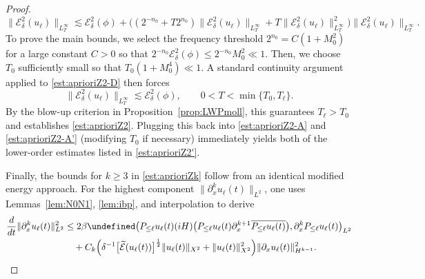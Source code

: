 \documentclass{amsart}
\numberwithin{equation}{section}
\let\Re=\undefined\DeclareMathOperator{\Re}{Re}
\begin{document}
\begin{proof}
\begin{equation}\label{est:aprioriZ2-D}
\| \mathcal{E}^2_\delta(u_\ell) \|_{L^\infty_T}\lesssim \mathcal{E}^2_\delta(\phi) +\Big( (2^{-n_0}+T2^{n_0}) \| \mathcal{E}^2_\delta(u_\ell) \|_{L^\infty_T} +T\| \mathcal{E}^2_\delta(u_\ell) \|_{L^\infty_T}^2\Big) \|\mathcal{E}^2_\delta(u_\ell) \|_{L^\infty_T} .
\end{equation}
To prove the main bounds, we select the frequency threshold $2^{n_0}=C(1+M_0^2)$ for a large constant $C>0$ so that $2^{-n_0}\mathcal{E}^2_\delta(\phi)\leq 2^{-n_0}M_0^2\ll 1$. Then, we choose $T_0$ sufficiently small so that $T_0(1+M_0^4)\ll 1$. A standard continuity argument applied to \eqref{est:aprioriZ2-D} then forces
$$\| \mathcal{E}^2_\delta(u_\ell) \|_{L^\infty_T}\lesssim \mathcal{E}^2_\delta(\phi),\qquad 0<T<\min \{ T_0,T_\ell\}. $$
By the blow-up criterion in Proposition~\ref{prop:LWPmoll}, this guarantees $T_\ell>T_0$ and establishes \eqref{est:aprioriZ2}. Plugging this back into \eqref{est:aprioriZ2-A} and \eqref{est:aprioriZ2-A'} (modifying $T_0$ if necessary) immediately yields both of the lower-order estimates listed in \eqref{est:aprioriZ2'}.

Finally, the bounds for $k \geq 3$ in \eqref{est:aprioriZk} follow from an identical modified energy approach. For the highest component $\| \partial_x^ku_\ell(t) \|_{L^2}$, one uses Lemmas~\ref{lem:N0N1}, \ref{lem:ibp}, and interpolation to derive
\begin{equation}\label{est:aprioriZk-1}
\begin{aligned}
\frac{d}{dt}\| \partial_x^ku_\ell(t) \|_{L^2}^2 &\leq 2\beta\Re \big( P_{\leq \ell}u_\ell(t)(iH)\big( P_{\leq \ell}u_\ell(t)\partial_x^{k+1}\overline{P_{\leq \ell}u_\ell(t)}\big) ,\partial_x^kP_{\leq \ell}u_\ell(t)\big)_{L^2} \\
&\quad +C_k\Big( \delta^{-1}\big[ \widetilde{\mathcal{E}}(u_\ell(t))\big] ^{\frac12}\| u_\ell(t) \|_{X^2}+\| u_\ell(t) \|_{X^2}^2\Big)\| \partial_xu_\ell(t) \|_{H^{k-1}}^2.
\end{aligned}
\end{equation}



\end{proof}
\end{document}
